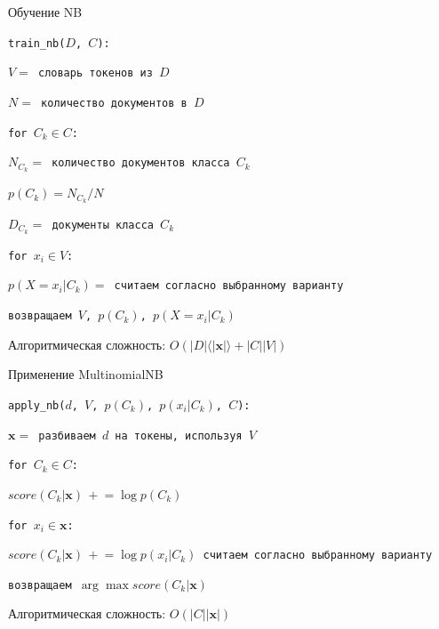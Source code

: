 \documentclass[10pt,a4paper]{beamer}
\begin{document}
\begin{frame}{Обучение NB}

\texttt{train\_nb($D$, $C$):}

\texttt{\quad $V = $ словарь токенов из $D$}

\texttt{\quad $N = $ количество документов в $D$}

\texttt{\quad for $C_k \in C$:}

\texttt{\quad\quad $N_{C_k} = $ количество документов класса $C_k$}

\texttt{\quad\quad $p(C_k) = N_{C_k}/N$}

\texttt{\quad\quad $D_{C_k} = $ документы класса $C_k$}

\texttt{\quad\quad for $x_i \in V$:}

\texttt{\quad\quad\quad $p(X = x_i | C_k) = $ считаем согласно выбранному варианту}

\texttt{\quad возвращаем $V$, $p(C_k)$, $p(X=x_i | C_k)$}

\vspace{1em}
Алгоритмическая сложность: $O(|D| \langle |\mathbf{x}| \rangle + |C||V|)$

\end{frame}


\begin{frame}{Применение MultinomialNB}

\texttt{apply\_nb($d$, $V$, $p(C_k)$, $p(x_i | C_k)$, $C$):}

\texttt{\quad $\mathbf{x} = $ разбиваем $d$ на токены, используя $V$}

\texttt{\quad for $C_k \in C$:}

\texttt{\quad\quad $score(C_k | \mathbf{x}) \, +\!\!= \log p(C_k)$}

\texttt{\quad\quad for $x_i \in \mathbf{x}$:}

\texttt{\quad\quad\quad $score(C_k|\mathbf{x})\,+\!\!= \log p(x_i | C_k)$ считаем согласно выбранному варианту}

\texttt{\quad возвращаем $\arg \max score(C_k | \mathbf{x})$}

\vspace{1em}
Алгоритмическая сложность: $O(|C||\mathbf{x}|)$

\end{frame}

\end{document}
